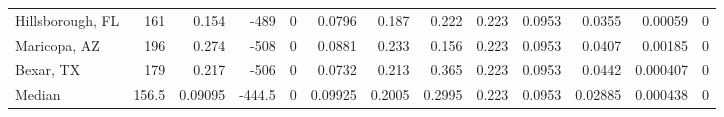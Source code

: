 \documentclass[12pt,letterpaper]{article}
\begin{document}
\begin{sidewaystable}
{\begin{tabular}{lrrrrrrrrrrrr}
 Hillsborough, FL   & 161   & 0.154   & -489   &     0 &         0.0796  &           0.187  &         0.222  &              0.223 &             0.0953 &           0.0355  &        0.00059  &                0 \\
 Maricopa, AZ       & 196   & 0.274   & -508   &     0 &         0.0881  &           0.233  &         0.156  &              0.223 &             0.0953 &           0.0407  &        0.00185  &                0 \\
 Bexar, TX          & 179   & 0.217   & -506   &     0 &         0.0732  &           0.213  &         0.365  &              0.223 &             0.0953 &           0.0442  &        0.000407 &                0 \\
\hline
 Median             & 156.5 & 0.09095 & -444.5 &     0 &         0.09925 &           0.2005 &         0.2995 &              0.223 &             0.0953 &           0.02885 &        0.000438 &                0 \\
\hline
\end{tabular}

}\end{sidewaystable}
\end{document}
